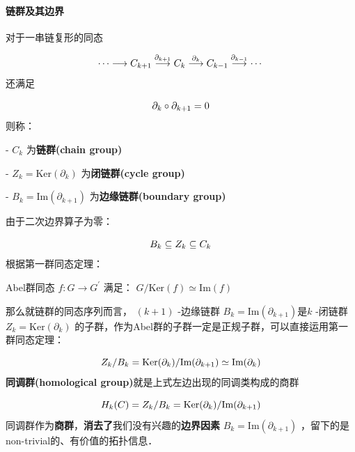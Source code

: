         \paragraph{链群及其边界}
            对于一串链复形的同态\par
            $$
                \cdots \longrightarrow  C_{k+1} \stackrel{\partial_{k+1}}{\longrightarrow} C_k \stackrel{\partial_k}{\longrightarrow} C_{k-1} \stackrel{\partial_{k-1}}{\longrightarrow} \cdots \\
            $$
            还满足\par
            $$
                \partial_k \circ \partial_{k+1}=0 \\
            $$
            则称：\par
            - $C_k$ 为\textbf{链群(chain group)}\par
            - $Z_k = \text{Ker}(\partial_k)$ 为\textbf{闭链群(cycle group)}\par
            - $B_k = \text{Im}(\partial_{k+1})$ 为\textbf{边缘链群(boundary group)}\par
            由于二次边界算子为零：\par
            $$
                B_k \subseteq Z_k \subseteq C_k \\
            $$
            根据第一群同态定理：\par
            Abel群同态 $f:G \to G^\prime$ 满足： $G/\text{Ker}(f) \simeq \text{Im}(f)$\par
            那么就链群的同态序列而言， $(k+1)$ -边缘链群 $B_k = \text{Im}(\partial_{k+1})$是$k$ -闭链群 $Z_k = \text{Ker}(\partial_k)$ 的子群，作为Abel群的子群一定是正规子群，可以直接运用第一群同态定理：\par
            $$
                Z_k/B_k = \text{Ker}(\partial_k)/ \text{Im}(\partial_{k+1}) \simeq \text{Im}(\partial_k) \\
            $$
            \textbf{同调群(homological group)}就是上式左边出现的同调类构成的商群\par
            $$
                H_k(C) = Z_k/B_k = \text{Ker}(\partial_k)/ \text{Im}(\partial_{k+1}) \\
            $$
            同调群作为\textbf{商群}，\textbf{消去了}我们没有兴趣的\textbf{边界因素} $B_k = \text{Im}(\partial_{k+1})$ ，留下的是non-trivial的、有价值的拓扑信息．\par

